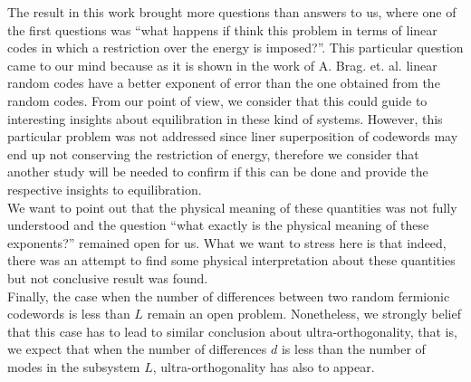 \indent The result in this work brought more questions than answers to us, where one of the first questions was ``what happens if think this problem in terms of linear codes in which a restriction over the energy is imposed?''. This particular question came to our mind because as it is shown in the work of A. Brag. et. al. \cite{barg_random_2002} linear random codes have a better exponent of error than the one obtained from the random codes. From our point of view, we consider that this could guide to interesting insights about equilibration in these kind of systems. However, this particular problem was not addressed since liner superposition of codewords may end up not conserving the restriction of energy, therefore we consider that another study will be needed to confirm if this can be done and provide the respective insights to equilibration.\\
\indent We want to point out that the physical meaning of these quantities was not fully understood and the question ``what exactly is the physical meaning of these exponents?'' remained open for us. What we want to stress here is that indeed, there was an attempt to find some physical interpretation about these quantities but not conclusive result was found.\\

\indent Finally, the case when the number of differences between two random fermionic codewords is less than $L$ remain an open problem. Nonetheless, we strongly belief that this case has to lead to similar conclusion about ultra-orthogonality, that is, we expect that when the number of differences $d$ is less than the number of modes in the subsystem $L$, ultra-orthogonality has also to appear.




